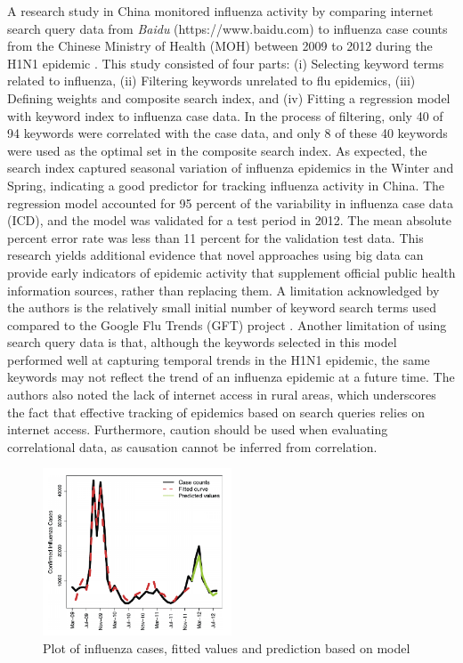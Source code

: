 \documentclass[sigconf]{acmart}
\begin{document}
A research study in China monitored influenza activity by comparing internet search query 
data from {\it Baidu} (https://www.baidu.com) to influenza case counts from the Chinese 
Ministry of Health (MOH) between 2009 to 2012 during the H1N1 epidemic \cite{yuan13}. 
This study consisted of four parts: (i) Selecting keyword terms related to influenza, (ii) 
Filtering keywords unrelated to flu epidemics, (iii) Defining weights and composite search 
index, and (iv) Fitting a regression model with keyword index to influenza case data. In the 
process of filtering, only 40 of 94 keywords were correlated with the case data, and only 8 
of these 40 keywords were used as the optimal set in the composite search index. As expected,
the search index captured seasonal variation of influenza epidemics in the Winter and Spring,
indicating a good predictor for tracking influenza activity in China.  The regression model 
accounted for 95 percent of the variability in influenza case data (ICD), and the model was 
validated for a test period in 2012. The mean absolute percent error rate was less than 11 
percent for the validation test data. This research yields additional evidence that novel 
approaches using big data can provide early indicators of epidemic activity that supplement 
official public health information sources, rather than replacing them. A limitation 
acknowledged by the authors is the relatively small initial number of keyword search terms 
used compared to the Google Flu Trends (GFT) project \cite{ginsburg09}. Another limitation 
of using search query data is that, although the keywords selected in this model performed 
well at capturing temporal trends in the H1N1 epidemic, the same keywords may not reflect 
the trend of an influenza epidemic at a future time. The authors also noted the lack of 
internet access in rural areas, which underscores the fact that effective tracking of 
epidemics based on search queries relies on internet access. Furthermore, caution should 
be used when evaluating correlational data, as causation cannot be inferred from correlation.

\begin{figure}
  \centering
  \includegraphics[width=0.5\textwidth]{images/Figure1.pdf}
  \caption{Plot of influenza cases, fitted values and prediction based on model \cite{yuan13}} \label{fig:Figure1} 
\end{figure}
\end{document}
